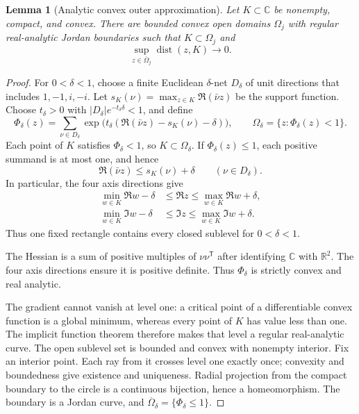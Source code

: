 \documentclass[11pt]{article}
\newtheorem{lemma}[theorem]{Lemma}
\theoremstyle{remark}\newtheorem{remark}[theorem]{Remark}
\newcommand{\dist}{\operatorname{dist}}
\newcommand{\C}{\mathbb C}
\begin{document}
\begin{lemma}[Analytic convex outer approximation]\label{lem:outer}
Let $K\subset\C$ be nonempty, compact, and convex. There are bounded convex open domains $\Omega_j$ with regular real-analytic Jordan boundaries such that $K\subset\Omega_j$ and
\[
 \sup_{z\in\overline\Omega_j}\dist(z,K)\longrightarrow0.
\]
\end{lemma}
\begin{proof}
For $0<\delta<1$, choose a finite Euclidean $\delta$-net $D_\delta$ of unit directions that includes $1,-1,i,-i$. Let $s_K(\nu)=\max_{z\in K}\Re(\bar\nu z)$ be the support function. Choose $t_\delta>0$ with $|D_\delta|e^{-t_\delta\delta}<1$, and define
\[
 \Phi_\delta(z)=\sum_{\nu\in D_\delta}
 \exp\bigl(t_\delta(\Re(\bar\nu z)-s_K(\nu)-\delta)\bigr),
 \qquad \Omega_\delta=\{z:\Phi_\delta(z)<1\}.
\]
Each point of $K$ satisfies $\Phi_\delta<1$, so $K\subset\Omega_\delta$.
If $\Phi_\delta(z)\le1$, each positive summand is at most one, and hence
\[
 \Re(\bar\nu z)\le s_K(\nu)+\delta\qquad(\nu\in D_\delta).
\]
In particular, the four axis directions give
\[
 \begin{aligned}
 \min_{w\in K}\Re w-\delta&\le\Re z\le\max_{w\in K}\Re w+\delta,\\
 \min_{w\in K}\Im w-\delta&\le\Im z\le\max_{w\in K}\Im w+\delta.
 \end{aligned}
\]
Thus one fixed rectangle contains every closed sublevel for $0<\delta<1$.

The Hessian is a sum of positive multiples of $\nu\nu^{\mathsf T}$ after identifying $\C$ with $\mathbb R^2$. The four axis directions ensure it is positive definite. Thus $\Phi_\delta$ is strictly convex and real analytic.

The gradient cannot vanish at level one: a critical point of a differentiable convex function is a global minimum, whereas every point of $K$ has value less than one. The implicit function theorem therefore makes that level a regular real-analytic curve. The open sublevel set is bounded and convex with nonempty interior. Fix an interior point. Each ray from it crosses level one exactly once; convexity and boundedness give existence and uniqueness. Radial projection from the compact boundary to the circle is a continuous bijection, hence a homeomorphism. The boundary is a Jordan curve, and $\overline\Omega_\delta=\{\Phi_\delta\le1\}$.


\end{proof}
\end{document}
